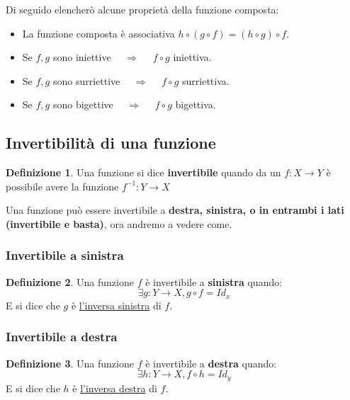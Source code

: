 \documentclass{article}
\theoremstyle{definition}
\newtheorem{definition}{Definizione}[section]
\begin{document}
Di seguido elencherò alcune proprietà della funzione composta:\label{proprietà_funzione_composta}
\begin{itemize}
        \item La funzione composta è associativa $ h \circ (g \circ f) =  (h \circ g ) \circ f$.
        \item Se $ f,g $ sono iniettive $\quad  \Rightarrow \quad $  $ f \circ g $ iniettiva.   
        \item Se $ f,g $ sono surriettive $\quad  \Rightarrow \quad $  $ f \circ g $ surriettiva.   
        \item Se $ f,g $ sono bigettive $\quad  \Rightarrow \quad $  $ f \circ g $ bigettiva.   
\end{itemize}



\subsection{Invertibilità di una funzione}\label{sec:invertibilità}
\begin{definition}
        Una funzione si dice \textbf{invertibile} quando da un $ f : X \to Y $ è possibile avere la funzione $ f^{-1} : Y \to X $   
\end{definition}

Una funzione può essere invertibile a \textbf{destra, sinistra, o in entrambi i lati (invertibile e basta)}, ora andremo a vedere come. 


\subsubsection{Invertibile a sinistra}\label{sec:invertibile_a_sinistra}
\begin{definition}     
        Una funzione $ f $  è invertibile a \textbf{sinistra} quando:
        \begin{equation*}
                \exists g : Y \to X, g \circ f = Id_x 
        \end{equation*}
        E si dice che $ g  $ è \underline{l'inversa sinistra} di $ f $.          
\end{definition}


\subsubsection{Invertibile a destra}\label{sec:invertibile_a_destra}
\begin{definition}     
        Una funzione $ f $ è invertibile a \textbf{destra} quando:
        \begin{equation*}
                \exists h : Y \to X, f \circ h = Id_y 
        \end{equation*}
        E si dice che $ h $ è \underline{l'inversa destra} di $ f $.           
\end{definition}
\end{document}
